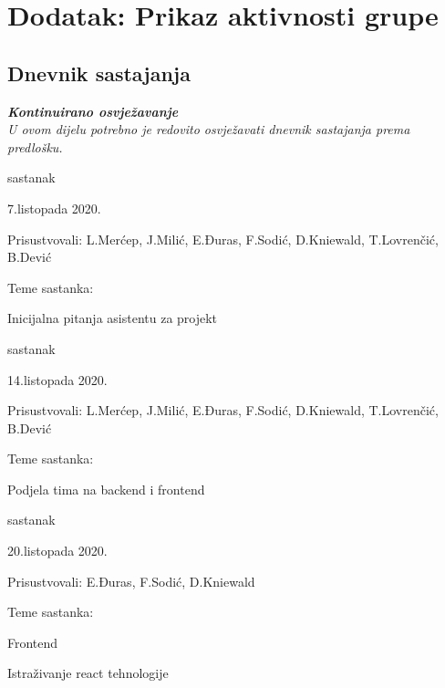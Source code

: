 \chapter*{Dodatak: Prikaz aktivnosti grupe}
		
		\section*{Dnevnik sastajanja}
		
		\textbf{\textit{Kontinuirano osvježavanje}}\\
		
		 \textit{U ovom dijelu potrebno je redovito osvježavati dnevnik sastajanja prema predlošku.}
		
		\begin{packed_enum}
			\item  sastanak
			
			\item[] \begin{packed_item}
				\item 7.listopada 2020.
				\item Prisustvovali: L.Merćep, J.Milić, E.Đuras, F.Sodić, D.Kniewald, T.Lovrenčić, B.Dević
				\item Teme sastanka:
				\begin{packed_item}
					\item  Inicijalna pitanja asistentu za projekt
				\end{packed_item}
			\end{packed_item}
			
			\item  sastanak
			\item[] \begin{packed_item}
				\item 14.listopada 2020.
				\item Prisustvovali: L.Merćep, J.Milić, E.Đuras, F.Sodić, D.Kniewald, T.Lovrenčić, B.Dević
				\item Teme sastanka:
				\begin{packed_item}
					\item  Podjela tima na backend i frontend
				\end{packed_item}
			\end{packed_item}
			
			\item  sastanak
			\item[] \begin{packed_item}
				\item 20.listopada 2020.
				\item Prisustvovali: E.Đuras, F.Sodić, D.Kniewald
				\item Teme sastanka:
				\begin{packed_item}
					\item  Frontend
					\item  Istraživanje react tehnologije
				\end{packed_item}
			\end{packed_item}
			

\end{packed_enum}
